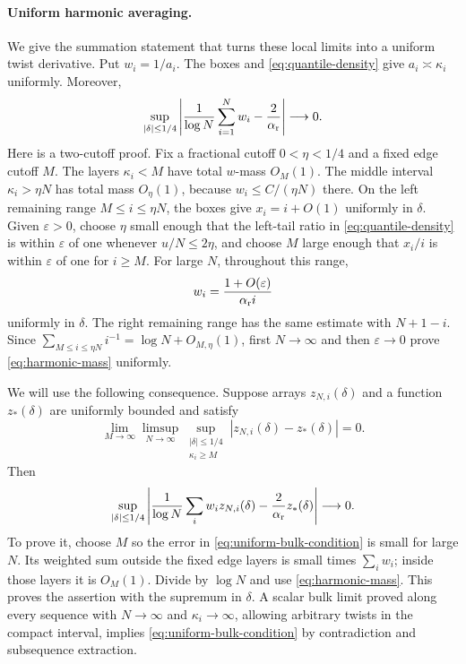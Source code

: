 \paragraph{Uniform harmonic averaging.}
We give the summation statement that turns these local limits into a uniform twist derivative. Put \(w_i=1/a_i\). The boxes and
\eqref{eq:quantile-density} give \(a_i\asymp\kappa_i\) uniformly. Moreover,
\begin{equation}\label{eq:harmonic-mass}
 \sup_{|\delta|\le1/4}
 \left|\frac1{\log N}\sum_{i=1}^Nw_i-\frac2{\alpha_{\rm r}}\right|
 \longrightarrow0.
\end{equation}
Here is a two-cutoff proof. Fix a fractional cutoff \(0<\eta<1/4\) and a fixed edge cutoff \(M\). The layers \(\kappa_i<M\) have total \(w\)-mass \(O_M(1)\). The middle interval \(\kappa_i>\eta N\) has total mass \(O_\eta(1)\), because \(w_i\le C/(\eta N)\) there. On the left remaining range \(M\le i\le\eta N\), the boxes give \(x_i=i+O(1)\) uniformly in \(\delta\). Given \(\varepsilon>0\), choose \(\eta\) small enough that the left-tail ratio in \eqref{eq:quantile-density} is within \(\varepsilon\) of one whenever \(u/N\le2\eta\), and choose \(M\) large enough that \(x_i/i\) is within \(\varepsilon\) of one for \(i\ge M\). For large \(N\), throughout this range,
\[
 w_i=\frac{1+O(\varepsilon)}{\alpha_{\rm r}i}
\]
uniformly in \(\delta\). The right remaining range has the same estimate with \(N+1-i\). Since
\(\sum_{M\le i\le\eta N}i^{-1}=\log N+O_{M,\eta}(1)\),
first \(N\to\infty\) and then \(\varepsilon\to0\) prove
\eqref{eq:harmonic-mass} uniformly.

We will use the following consequence. Suppose arrays \(z_{N,i}(\delta)\) and a function \(z_*(\delta)\) are uniformly bounded and satisfy
\begin{equation}\label{eq:uniform-bulk-condition}
 \lim_{M\to\infty}\limsup_{N\to\infty}
 \sup_{\substack{|\delta|\le1/4\\ \kappa_i\ge M}}
 |z_{N,i}(\delta)-z_*(\delta)|=0.
\end{equation}
Then
\begin{equation}\label{eq:harmonic-averaging}
 \sup_{|\delta|\le1/4}
 \left|\frac1{\log N}\sum_iw_i z_{N,i}(\delta)
       -\frac2{\alpha_{\rm r}}z_*(\delta)\right|\longrightarrow0.
\end{equation}
To prove it, choose \(M\) so the error in \eqref{eq:uniform-bulk-condition} is small for large \(N\). Its weighted sum outside the fixed edge layers is small times \(\sum_iw_i\); inside those layers it is \(O_M(1)\). Divide by \(\log N\) and use \eqref{eq:harmonic-mass}. This proves the assertion with the supremum in \(\delta\). A scalar bulk limit proved along every sequence with \(N\to\infty\) and \(\kappa_i\to\infty\), allowing arbitrary twists in the compact interval, implies \eqref{eq:uniform-bulk-condition} by contradiction and subsequence extraction.

